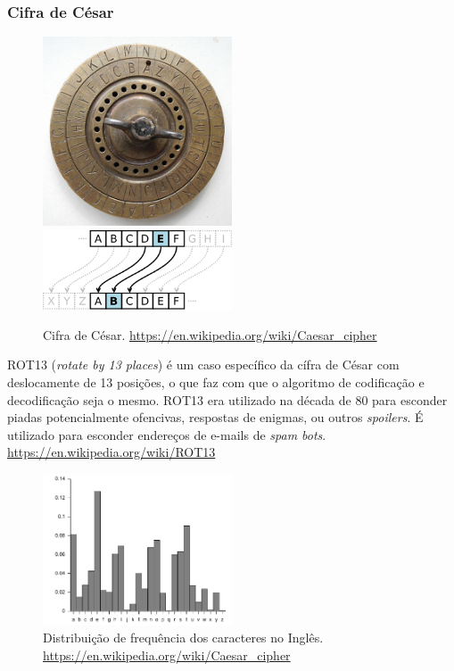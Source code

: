 \begin{frame}[allowframebreaks]
\frametitle{Cifra de César}

\begin{figure}[h]
\centering
\includegraphics[width=0.5\textwidth,height=0.5\textheight,keepaspectratio]{figures/caesar.jpg}
\includegraphics[width=0.5\textwidth,height=0.5\textheight,keepaspectratio]{figures/CaesarCipher.png}
\caption{Cifra de César. \url{https://en.wikipedia.org/wiki/Caesar_cipher}}
\label{fig-cifracaesar}
\end{figure}

ROT13 (\emph{rotate by 13 places}) é um caso específico da cífra de César com deslocamente de 13 posições, o que 
faz com que o algoritmo de codificação e decodificação seja o mesmo.
ROT13 era utilizado na década de 80 para esconder piadas potencialmente ofencivas, respostas de enigmas, ou 
outros \emph{spoilers}. É utilizado para esconder endereços de e-mails de \emph{spam bots}.
\url{https://en.wikipedia.org/wiki/ROT13}

\begin{figure}[h]
\centering
\includegraphics[width=0.5\textwidth,height=0.5\textheight,keepaspectratio]{figures/English_letter_frequency.pdf}
\caption{Distribuição de frequência dos caracteres no Inglês. \url{https://en.wikipedia.org/wiki/Caesar_cipher}}
\label{fig-eng-letters-dist}
\end{figure}

\end{frame}



